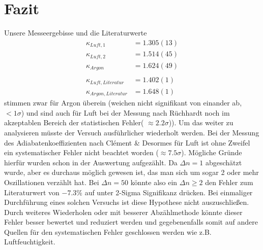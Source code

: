 \documentclass[a4paper,10pt]{article}
\begin{document}
\section{Fazit}
Unsere Messeergebisse und die Literaturwerte
\begin{align*}
\kappa_{Luft,1}&=1.305(13)\\
\kappa_{Luft,2}&=1.514(45)\\
\kappa_{Argon}&=1.624(49)\\\\
\kappa_{Luft,Literatur}&=1.402(1)\\
\kappa_{Argon,Literatur}&=1.648(1)
\end{align*}
stimmen zwar für Argon überein (weichen nicht signifikant von einander ab, \(< 1\sigma\)) und sind auch für Luft bei der Messung nach Rüchhardt noch im akzeptablen Bereich der statistischen Fehler( \(\approx2.2\sigma\))). Um das weiter zu analysieren müsste der Versuch ausführlicher wiederholt werden.
Bei der Messung des Adiabatenkoeffizienten nach Clément \& Desormes für Luft ist ohne Zweifel ein systematischer Fehler nicht beachtet worden (\(\approx 7.5\sigma\)). Mögliche Gründe hierfür wurden schon  in der Auswertung aufgezählt. Da \(\Delta n = 1\) abgeschätzt wurde, aber es durchaus möglich gewesen ist, das man sich um sogar 2 oder mehr Oszillationen verzählt hat. Bei \(\Delta n = 50\) könnte also ein \(\Delta n \geqslant 2\) den Fehler zum Literaturwert von \(-7.3\%\) auf unter 2-Sigma Signifikanz drücken. Bei einmaliger Durchführung eines solchen Versuchs ist diese Hypothese nicht auszuschließen. Durch weiteres Wiederholen oder mit besserer Abzählmethode könnte dieser Fehler besser bewertet und reduziert werden und gegebenenfalls somit auf andere Quellen für den systematischen Fehler geschlossen werden wie z.B. Luftfeuchtigkeit.
\unboldmath
\end{document}
